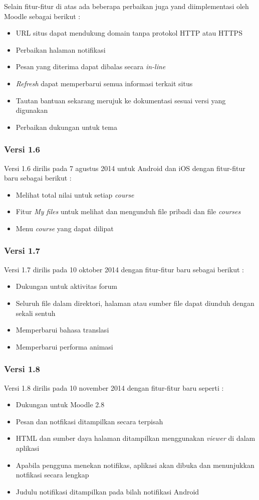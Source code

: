 Selain fitur-fitur di atas ada beberapa perbaikan juga yand diimplementasi oleh Moodle sebagai berikut :
	\begin{itemize}
		\item URL situs dapat mendukung domain tanpa protokol HTTP atau HTTPS
		\item Perbaikan halaman notifikasi
		\item Pesan yang diterima dapat dibalas secara \textit{in-line}
		\item \textit{Refresh} dapat memperbarui semua informasi terkait situs
		\item Tautan bantuan sekarang merujuk ke dokumentasi sesuai versi yang digunakan
		\item Perbaikan dukungan untuk tema
	\end{itemize}
	
\subsubsection{Versi 1.6}
Versi 1.6 dirilis pada 7 agustus 2014 untuk Android dan iOS dengan fitur-fitur baru sebagai berikut : \cite{moodle:dev}
	\begin{itemize}
		\item Melihat total nilai untuk setiap \textit{course}
		\item Fitur \textit{My files} untuk melihat dan mengunduh file pribadi dan file \textit{courses}
		\item Menu \textit{course} yang dapat dilipat
	\end{itemize}

\subsubsection{Versi 1.7}
Versi 1.7 dirilis pada 10 oktober 2014 dengan fitur-fitur baru sebagai berikut :  \cite{moodle:dev}
	\begin{itemize}
		\item Dukungan untuk aktivitas forum
		\item Seluruh file dalam direktori, halaman atau sumber file dapat diunduh dengan sekali sentuh
		\item Memperbarui bahasa translasi
		\item Memperbarui performa animasi 
	\end{itemize}
\subsubsection{Versi 1.8}
Versi 1.8 dirilis pada 10 november 2014 dengan fitur-fitur baru seperti :\cite{moodle:dev}
	\begin{itemize}
		\item Dukungan untuk Moodle 2.8
		\item Pesan dan notfikasi ditampilkan secara terpisah
		\item HTML dan sumber daya halaman ditampilkan menggunakan \textit{viewer} di dalam aplikasi
		\item Apabila pengguna menekan notifikas, aplikasi akan dibuka dan menunjukkan notfikasi secara lengkap
		\item Judulu notifikasi ditampilkan pada bilah notifikasi Android
	\end{itemize}
